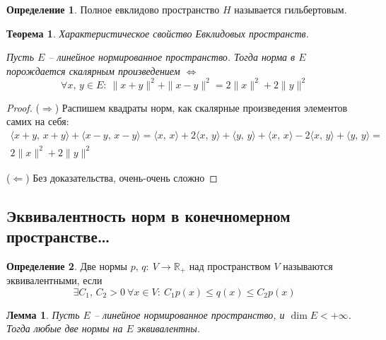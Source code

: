 \documentclass[a4paper,12pt]{article}
\renewcommand{\leq}{\ensuremath{\leqslant}}
\theoremstyle{plain}
\newtheorem{theorem}{Теорема}[section]
\newtheorem{lemma}{Лемма}[section]
\theoremstyle{definition}
\newtheorem{definition}{Определение}[section]
\theoremstyle{remark}
\begin{document}
\begin{definition}
	Полное евклидово пространство $H$ называется гильбертовым.
\end{definition}

\begin{theorem}
	Характеристическое свойство Евклидовых пространств.

	Пусть $E$ -- линейное нормированное пространство. Тогда норма в $E$ порождается скалярным произведением $\Leftrightarrow$
	\[
		\forall x,\, y \in E :\: \|x + y\|^2 + \|x - y\|^2 = 2\|x\|^2 + 2\|y\|^2
	\]
\end{theorem}

\begin{proof}
	($\Rightarrow$) Распишем квадраты норм, как скалярные произведения элементов самих на себя:
	\begin{align*}
		\langle x + y,\, x + y\rangle + \langle x -y ,\, x - y\rangle = \langle x,\, x\rangle + 2\langle x,\, y\rangle + \langle y,\, y\rangle + \langle x,\, x\rangle - 2\langle x,\, y\rangle + \langle y,\, y\rangle = \\
		2\|x\|^2 + 2\|y\|^2
	\end{align*}

	($\Leftarrow$) Без доказательства, очень-очень сложно
\end{proof}

\subsection{Эквивалентность норм в конечномерном пространстве\dots}
\begin{definition}
	Две нормы $p,\, q :\: V \to \mathbb{R}_+$ над пространством $V$ называются эквивалентными, если
	\[
		\exists C_1,\, C_2 > 0 \: \forall x \in V :\: C_1p(x) \leq q(x) \leq C_2p(x)
	\]
\end{definition}

\begin{lemma}
	Пусть $E$ -- линейное нормированное пространство, и $\dim E < +\infty$. Тогда любые две нормы на $E$ эквивалентны.
\end{lemma}
\end{document}
